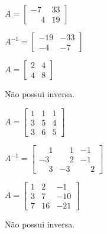 \documentclass[12pt]{exam}
\begin{document}
\begin{exercicio}
  $
    A =\begin{bmatrix}
        -7 & 33\\
        \phantom{-} 4 & 19
    \end{bmatrix}
  $
  \begin{solucao}
    $A^{-1} =\begin{bmatrix}
      -19 & -33\\
      -4 & -7
    \end{bmatrix}$
  \end{solucao}
\end{exercicio}

\begin{exercicio}
  $
    A =\begin{bmatrix}
        2 & 4\\
        4 & 8
    \end{bmatrix}
  $
  \begin{solucao}
    N\~ao possui inversa.
  \end{solucao}
\end{exercicio}

\begin{exercicio}
  $
    A =\begin{bmatrix}
        1 & 1 & 1\\
        3 & 5 & 4\\
        3 & 6 & 5
      \end{bmatrix}
    $
  \begin{solucao}
    $
      A^{-1} =\begin{bmatrix}
        \phantom{-} 1 & \phantom{-} 1 & -1\\
        -3 & \phantom{-} 2 & -1\\
        \phantom{-} 3 & -3 & \phantom{-} 2
      \end{bmatrix}
    $
  \end{solucao}
\end{exercicio}

\begin{exercicio}
  $
    A =\begin{bmatrix}
        1 & 2 & -1\\
        3 & 7 & -10\\
        7 & 16 & -21
    \end{bmatrix}
  $
  \begin{solucao}
    N\~ao possui inversa.
  \end{solucao}
\end{exercicio}
\end{document}
